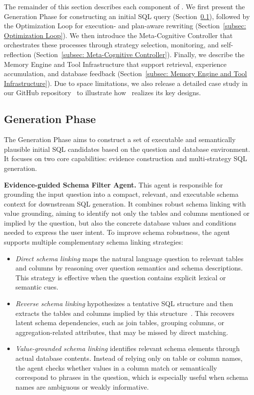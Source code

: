 The remainder of this section describes each component of \toolname.
We first present the Generation Phase for constructing an initial SQL query (Section~\ref{subsec: Generation Phase}), followed by the Optimization Loop for execution- and plan-aware rewriting (Section~\ref{subsec: Optimization Loop}).
We then introduce the Meta-Cognitive Controller that orchestrates these processes through strategy selection, monitoring, and self-reflection (Section~\ref{subsec: Meta-Cognitive Controller}).
Finally, we describe the Memory Engine and Tool Infrastructure that support retrieval, experience accumulation, and database feedback (Section~\ref{subsec: Memory Engine and Tool Infrastructure}).
Due to space limitations, we also release a detailed case study in our GitHub repository~\cite{optsql_case_study} to illustrate how \toolname\ realizes its key designs.

\subsection{Generation Phase}
\label{subsec: Generation Phase}
The Generation Phase aims to construct a set of executable and semantically plausible initial SQL candidates based on the question and database environment.
It focuses on two core capabilities: evidence construction and multi-strategy SQL generation.

\textbf{Evidence-guided Schema Filter Agent.}
This agent is responsible for grounding the input question into a compact, relevant, and executable schema context for downstream SQL generation.
It combines robust schema linking with value grounding, aiming to identify not only the tables and columns mentioned or implied by the question, but also the concrete database values and conditions needed to express the user intent.
To improve schema robustness, the agent supports multiple complementary schema linking strategies:

\begin{itemize}[leftmargin=10pt]
	\item \textit{Direct schema linking} maps the natural language question to relevant tables and columns by reasoning over question semantics and schema descriptions.
	This strategy is effective when the question contains explicit lexical or semantic cues.
	
	\item \textit{Reverse schema linking} hypothesizes a tentative SQL structure and then extracts the tables and columns implied by this structure~\cite{li2026deepeye}.
	This recovers latent schema dependencies, such as join tables, grouping columns, or aggregation-related attributes, that may be missed by direct matching.
	
	\item \textit{Value-grounded schema linking} identifies relevant schema elements through actual database contents.
	Instead of relying only on table or column names, the agent checks whether values in a column match or semantically correspond to phrases in the question, which is especially useful when schema names are ambiguous or weakly informative.
\end{itemize}


